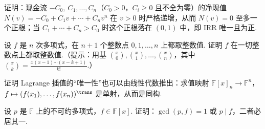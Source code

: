 {\begin{exB}
			\item\label{ex:poly:B13} 证明：现金流 $-C_0,\ C_1,\ldots,C_n$（$C_0>0$，$C_i\ge0$ 且不全为零）的净现值 $N(v)=-C_0+C_1v+\cdots+C_nv^n$ 在 $v>0$ 时严格递增，从而 $N(v)=0$ 至多一个正根；当 $C_1+\cdots+C_n>C_0$ 时这个正根落在 $(0,1)$ 中，即 IRR 唯一且为正.
			\item\label{ex:poly:B14} 设 $f$ 是 $n$ 次多项式，在 $n+1$ 个整数点 $0,1,\ldots,n$ 上都取整数值. 证明 $f$ 在一切整数点上都取整数值.（提示：用基 $\binom x0,\binom x1,\ldots,\binom xn$，其中 $\binom xk=\frac{x(x-1)\cdots(x-k+1)}{k!}$.）
			\item\label{ex:poly:B15} 证明 Lagrange 插值的“唯一性”也可以由线性代数推出：求值映射 $\mathbb{F}[x]_n\to\mathbb{F}^n$，$f\mapsto(f(x_1),\ldots,f(x_n))^\trans$ 是单射，从而是同构.
			\item\label{ex:poly:B16} 设 $p$ 是 $\mathbb{F}$ 上的不可约多项式，$f\in\mathbb{F}[x]$. 证明：$\gcd(p,f)=1$ 或 $p\mid f$，二者必居其一.
		\end{exB}
		
}

